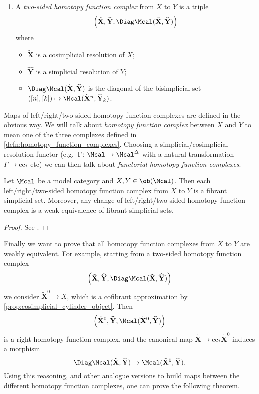 \begin{defn}
\begin{enumerate}
                \item A \emph{two-sided homotopy function complex} from $X$ to $Y$ is a triple
                \[
                   \left( \tilde{ \mathbf{X} }, \widehat{\mathbf{Y}}, \Diag \Mcal(\tilde{\mathbf{X}}, \widehat{\mathbf{Y}}) \right) 
                \] 
                where 
                \begin{itemize}
                    \item $\tilde{\mathbf{X}}$ is a cosimplicial resolution of $X$;
                    \item $\widehat{\mathbf{Y}}$ is a simplicial resolution of $Y$;
                    \item $\Diag \Mcal(\tilde{\mathbf{X}}, \widehat{\mathbf{Y}})$ is the diagonal of the bisimplicial set $([n], [k]) \mapsto \Mcal(\tilde{\mathbf{X}}^n, \widehat{\mathbf{Y}}_k)$.
                \end{itemize}
            \end{enumerate}
        \end{defn}
        Maps of left/right/two-sided homotopy function complexes are defined in the obvious way. We will talk about \emph{homotopy function complex} between $X$ and $Y$ to mean one of the three complexes defined in \cref{defn:homotopy_function_complexes}. Choosing a simplicial/cosimplicial resolution functor (e.g.\ $\Gamma\colon \Mcal \to \Mcal^{\Delta}$ with a natural transformation $\Gamma \to \mathrm{cc}_*$ etc) we can then talk about \emph{functorial homotopy function complexes}.

        \begin{prop}
            \label{prop:homotopy_function_complexes_fibrant}
            Let $\Mcal$ be a model category and $X, Y \in \ob(\Mcal)$. Then each left/right/two-sided homotopy function complex from $X$ to $Y$ is a fibrant simplicial set. Moreover, any change of left/right/two-sided homotopy function complex is a weak equivalence of fibrant simplicial sets.
        \end{prop}
        \begin{proof}
            See \cite[Proposition~17.1.3, 17.1.6, 17.2.3, 17.2.6, 17.3.2, 17.3.4]{Hirs:loc}.
        \end{proof}
        Finally we want to prove that all homotopy function complexes from $X$ to $Y$ are weakly equivalent. For example, starting from a two-sided homotopy function complex \[\left(\tilde{\mathbf{X}}, \widehat{\mathbf{Y}}, \Diag \Mcal(\tilde{\mathbf{X}}, \widehat{\mathbf{Y}}) \right) \] we consider $\tilde{\mathbf{X}}^0 \to X$, which is a cofibrant approximation by \cref{prop:cosimplicial_cylinder_object}. Then \[\left(\tilde{\mathbf{X}}^0, \widehat{\mathbf{Y}}, \Mcal(\tilde{\mathbf{X}}^0, \widehat{\mathbf{Y}}) \right) \] is a right homotopy function complex, and the canonical map $\tilde{\mathbf{X}} \to \mathrm{cc}_*\tilde{\mathbf{X}}^0$ induces a morphism \[\Diag \Mcal(\tilde{\mathbf{X}}, \widehat{\mathbf{Y}}) \to \Mcal(\tilde{\mathbf{X}}^0, \widehat{\mathbf{Y}}). \] Using this reasoning, and other analogue versions to build maps between the different homotopy function complexes, one can prove the following theorem.

